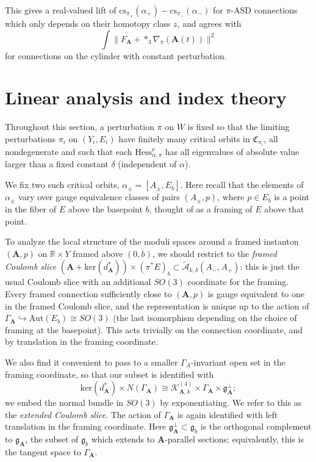 \documentclass{memo-l}
\newcommand{\pE}{\pi^* \! E}
\theoremstyle{definition}
\theoremstyle{remark}
\numberwithin{section}{chapter}
\numberwithin{equation}{chapter}
\begin{document}
This gives a real-valued lift of $\text{cs}_{\pi_+}(\alpha_+) - \text{cs}_{\pi_-}(\alpha_-)$ for $\pi$-ASD connections which only depends on their homotopy class $z$, and agrees with
$$\int \|F_{\mathbf{A}} + *_3\nabla_\pi(\mathbf{A}(t))\|^2$$
for connections on the cylinder with constant perturbation.

\section{Linear analysis and index theory}\label{sec:4d-linear}
Throughout this section, a perturbation $\pi$ on $W$ is fixed so that the limiting perturbations $\pi_i$ on $(Y_i,E_i)$ have finitely many critical orbits in $\mathfrak C_{\pi_i}$, all nondegenerate and such that each $\text{Hess}^\nu_{\alpha, \pi}$ has all eigenvalues of absolute value larger than a fixed constant $\delta$ (independent of $\alpha$).

We fix two such critical orbits, $\alpha_\pm = [A_\pm, E_b]$. Here recall that the elements of $\alpha_\pm$ vary over gauge equivalence classes of pairs $(A_\pm, p)$, where $p \in E_b$ is a point in the fiber of $E$ above the basepoint $b$, thought of as a framing of $E$ above that point.

To analyze the local structure of the moduli spaces around a framed instanton $(\mathbf{A},p)$ on $\mathbb R \times Y$ framed above $(0,b)$, we should restrict to the \textit{framed Coulomb slice} $\left(\mathbf{A}+\text{ker}(d_\mathbf{A}^*)\right) \times (\pE)_b \subset \widetilde{\mathcal A}_{k,\delta}(A_-, A_+)$: this is just the usual Coulomb slice with an additional $SO(3)$ coordinate for the framing. Every framed connection sufficiently close to $(\mathbf{A},p)$ is gauge equivalent to one in the framed Coulomb slice, and the representation is unique up to the action of $\Gamma_{\mathbf{A}} \hookrightarrow \text{Aut}(E_b) \cong SO(3)$ (the last isomorphism depending on the choice of framing at the basepoint). This acts trivially on the connection coordinate, and by translation in the framing coordinate.

We also find it convenient to pass to a smaller $\Gamma_A$-invariant open set in the framing coordinate, so that our subset is identified with 
\begin{equation}\label{eCoulomb}\text{ker}(d_{\mathbf{A}}^*) \times N(\Gamma_{\mathbf{A}}) \cong \mathcal K^{(4)}_{\mathbf{A},k} \times \Gamma_{\mathbf{A}} \times \mathfrak g_\mathbf{A}^\perp;\end{equation} 
we embed the normal bundle in $SO(3)$ by exponentiating. We refer to this as the \textit{extended Coulomb slice}. The action of $\Gamma_{\mathbf{A}}$ is again identified with left translation in the framing coordinate. Here $\mathfrak g_{\mathbf{A}}^\perp \subset \mathfrak g_b$ is the orthogonal complement to $\mathfrak g_{\mathbf{A}}$, the subset of $\mathfrak g_b$ which extends to $\mathbf{A}$-parallel sections; equivalently, this is the tangent space to $\Gamma_{\mathbf{A}}$. 
\end{document}

